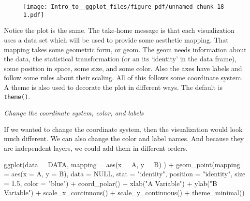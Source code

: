 \documentclass[
  letterpaper,
  DIV=11,
  numbers=noendperiod]{scrartcl}
\newenvironment{Shaded}{\begin{snugshade}}{\end{snugshade}}
\newcommand{\AttributeTok}[1]{\textcolor[rgb]{0.40,0.45,0.13}{#1}}
\newcommand{\ConstantTok}[1]{\textcolor[rgb]{0.56,0.35,0.01}{#1}}
\newcommand{\FloatTok}[1]{\textcolor[rgb]{0.68,0.00,0.00}{#1}}
\newcommand{\FunctionTok}[1]{\textcolor[rgb]{0.28,0.35,0.67}{#1}}
\newcommand{\NormalTok}[1]{\textcolor[rgb]{0.00,0.23,0.31}{#1}}
\newcommand{\SpecialCharTok}[1]{\textcolor[rgb]{0.37,0.37,0.37}{#1}}
\newcommand{\StringTok}[1]{\textcolor[rgb]{0.13,0.47,0.30}{#1}}
\begin{document}
\begin{figure}[H]

{\centering \texttt{[image: Intro\_to\_\_ggplot\_files/figure-pdf/unnamed-chunk-18-1.pdf]}

}

\end{figure}

Notice the plot is the same. The take-home message is that each
visualization uses a data set which will be used to provide some
aesthetic mapping. That mapping takes some geometric form, or geom. The
geom needs information about the data, the statistical transformation
(or an its `identity' in the data frame), some position in space, some
size, and some color. Also the axes have labels and follow some rules
about their scaling. All of this follows some coordinate system. A theme
is also used to decorate the plot in different ways. The default is
\texttt{theme()}.

\emph{Change the coordinate system, color, and labels}

If we wanted to change the coordinate system, then the visualization
would look much different. We can also change the color and label names.
And because they are independent layers, we could add them in different
orders.

\begin{Shaded}
\begin{Highlighting}[]
\FunctionTok{ggplot}\NormalTok{(}\AttributeTok{data =}\NormalTok{ DATA, }
       \AttributeTok{mapping =} \FunctionTok{aes}\NormalTok{(}\AttributeTok{x =}\NormalTok{ A, }\AttributeTok{y =}\NormalTok{ B)}
\NormalTok{       ) }\SpecialCharTok{+}
  \FunctionTok{geom\_point}\NormalTok{(}\AttributeTok{mapping =} \FunctionTok{aes}\NormalTok{(}\AttributeTok{x =}\NormalTok{ A, }\AttributeTok{y =}\NormalTok{ B),   }
             \AttributeTok{data =} \ConstantTok{NULL}\NormalTok{, }
             \AttributeTok{stat =} \StringTok{"identity"}\NormalTok{, }
             \AttributeTok{position =} \StringTok{"identity"}\NormalTok{, }
             \AttributeTok{size =} \FloatTok{1.5}\NormalTok{,}
             \AttributeTok{color =} \StringTok{"blue"}\NormalTok{) }\SpecialCharTok{+}
  \FunctionTok{coord\_polar}\NormalTok{() }\SpecialCharTok{+}
  \FunctionTok{xlab}\NormalTok{(}\StringTok{"A Variable"}\NormalTok{) }\SpecialCharTok{+}
  \FunctionTok{ylab}\NormalTok{(}\StringTok{"B Variable"}\NormalTok{) }\SpecialCharTok{+}
  \FunctionTok{scale\_x\_continuous}\NormalTok{() }\SpecialCharTok{+}
  \FunctionTok{scale\_y\_continuous}\NormalTok{() }\SpecialCharTok{+}
  \FunctionTok{theme\_minimal}\NormalTok{()}
\end{Highlighting}
\end{Shaded}
\end{document}
